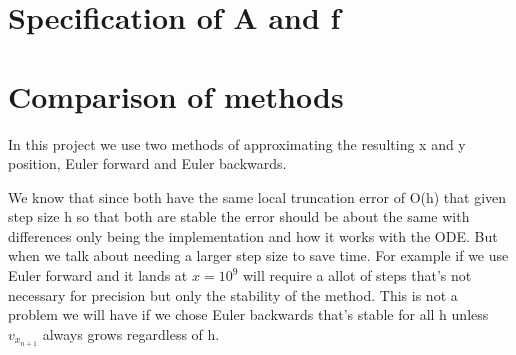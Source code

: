 \documentclass{article}
\begin{document}
\section{Specification of A and f}

\section{Comparison of methods}
In this project we use two methods of approximating the resulting x and y position, Euler forward and Euler backwards.

We know that since both have the same local truncation error of O(h) that given step size h so that both are stable the error should be about the same with differences only being the implementation and how it works with the ODE. But when we talk about needing a larger step size to save time. For example if we use Euler forward and it lands at $x=10^9$ will require a allot of steps that's not necessary for precision but only the stability of the method. This is not a problem we will have if we chose Euler backwards that's stable for all h unless $v_{x_{n+1}}$ always grows regardless of h.

\end{document}
